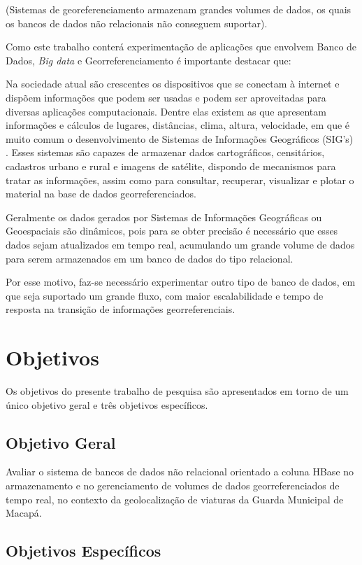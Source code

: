 (Sistemas de georeferenciamento armazenam grandes volumes de dados, os quais os bancos de dados não relacionais não conseguem suportar).


Como este trabalho conterá experimentação de aplicações que envolvem Banco de Dados, \textit{Big data} e Georreferenciamento é importante destacar que:

Na sociedade atual são crescentes os dispositivos que se conectam à internet e dispõem informações que podem ser usadas e podem ser aproveitadas para diversas aplicações computacionais\cite{Vega}. Dentre elas existem as que apresentam informações e cálculos de lugares, distâncias, clima, altura, velocidade, em que é muito comum o desenvolvimento de Sistemas de Informações Geográficos (SIG’s) \cite{Vega}. Esses sistemas são capazes de armazenar dados cartográficos, censitários, cadastros urbano e rural e imagens de satélite, dispondo de mecanismos para tratar as informações, assim como para consultar, recuperar, visualizar e plotar o material na base de dados georreferenciados\cite{Vega}.

Geralmente os dados gerados por Sistemas de Informações Geográficas ou Geoespaciais são dinâmicos, pois para se obter precisão é necessário que esses dados sejam atualizados em tempo real, acumulando um grande volume de dados para serem armazenados em um banco de dados do tipo relacional\cite{Prikh}.

Por esse motivo, faz-se necessário experimentar outro tipo de banco de dados, em que seja suportado um grande fluxo, com maior escalabilidade e tempo de resposta na transição de informações georreferenciais.

\section{Objetivos}
Os objetivos do presente trabalho de pesquisa são apresentados em torno de um único objetivo geral e três objetivos específicos.

\subsection{Objetivo Geral}

Avaliar o sistema de bancos de dados não relacional orientado a coluna HBase no armazenamento e no gerenciamento de volumes de dados georreferenciados de tempo real, no contexto da geolocalização de viaturas da Guarda Municipal de Macapá.

\subsection {Objetivos Específicos}

